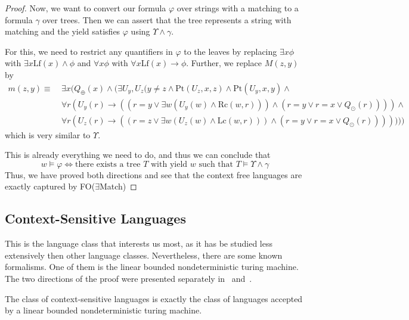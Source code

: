 \begin{proof}
    Now, we want to convert our formula $\varphi$ over strings with a matching to a formula $\gamma$ over trees.
    Then we can assert that the tree represents a string with matching and the yield satisfies $\varphi$ using $\Upsilon \land \gamma$.

    For this, we need to restrict any quantifiers in $\varphi$ to the leaves by replacing $\exists x \phi$ with $\exists x \text{Lf}(x) \land \phi$ and $\forall x \phi$ with $\forall x \text{Lf}(x) \to \phi$.
    Further, we replace $M(z, y)$ by
    \begin{align*}
        m(z, y) \equiv~& \exists x ( Q_{\oplus}(x) \land ( \exists U_y, U_z (y \neq z \land \text{Pt}(U_z, x, z) \land \text{Pt}(U_y, x, y) \land \\
        &\forall r (U_y(r) \to ((r = y \lor \exists w (U_y(w) \land \text{Rc}(w, r)))\land (r = y \lor r = x \lor Q_{\odot}(r)))) \land \\
        &\forall r (U_z(r) \to ((r = z \lor \exists w (U_z(w) \land \text{Lc}(w, r)))\land (r = y \lor r = x \lor Q_{\odot}(r)))))))
    \end{align*}
    which is very similar to $\Upsilon$.

    This is already everything we need to do, and thus we can conclude that
    \[w \models \varphi \Leftrightarrow \text{there exists a tree $T$ with yield $w$ such that } T \models \Upsilon \land \gamma \]
    Thus, we have proved both directions and see that the context free languages are exactly captured by FO($\exists$Match)
\end{proof}

\subsection{Context-Sensitive Languages}\label{subsec:des-context-sensitive-languages}

This is the language class that interests us most, as it has be studied less extensively then other language classes.
Nevertheless, there are some known formalisms.
One of them is the linear bounded nondeterministic turing machine.
The two directions of the proof were presented separately in~\cite{Kuroda1964} and~\cite{Landweber1963}.

\begin{theorem}\label{thm:nspacecontextsensitive}
    The class of context-sensitive languages is exactly the class of languages accepted by a linear bounded nondeterministic turing machine.
\end{theorem}

